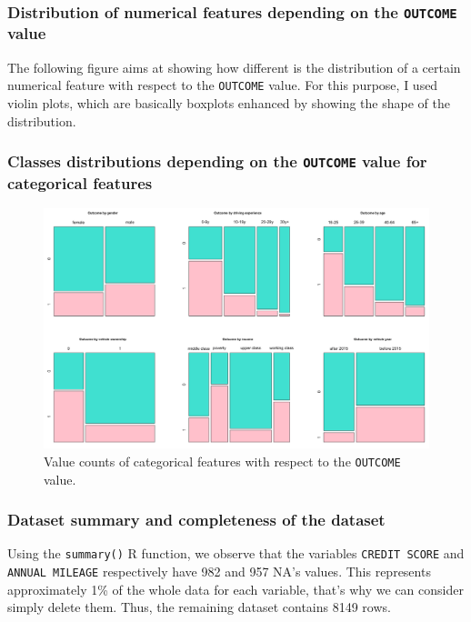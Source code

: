 \documentclass[a4paper,11pt]{article}
\begin{document}
\subsubsection{Distribution of numerical features depending on the {\tt OUTCOME} value}

The following figure aims at showing how different is the distribution of a certain numerical feature with respect to the {\tt OUTCOME} value. For this purpose, I used violin plots, which are basically boxplots enhanced by showing the shape of the distribution.

\subsubsection{Classes distributions depending on the {\tt OUTCOME} value for categorical features}

\begin{figure}[!h]
    \centering
    \includegraphics[scale=0.3]{eda-report.png}
    \caption{Value counts of categorical features with respect to the {\tt OUTCOME} value.}
\end{figure}

\subsubsection{Dataset summary and completeness of the dataset}

Using the {\tt summary()} R function, we observe that the variables {\tt CREDIT SCORE} and {\tt ANNUAL MILEAGE} respectively have 982 and 957 NA's values. This represents approximately 1\% of the whole data for each variable, that's why we can consider simply delete them. Thus, the remaining dataset contains 8149 rows. 
\end{document}
